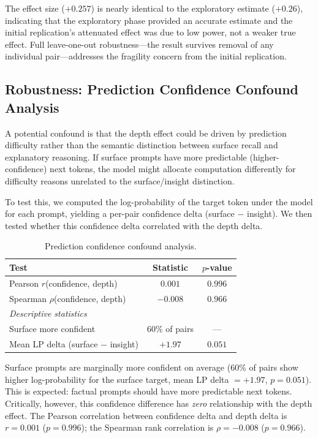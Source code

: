\documentclass[10pt]{article}
\begin{document}
The effect size ($+0.257$) is nearly identical to the exploratory estimate ($+0.26$), indicating that the exploratory phase provided an accurate estimate and the initial replication's attenuated effect was due to low power, not a weaker true effect. Full leave-one-out robustness---the result survives removal of any individual pair---addresses the fragility concern from the initial replication.

\subsection{Robustness: Prediction Confidence Confound Analysis}
\label{sec:confound}

A potential confound is that the depth effect could be driven by prediction difficulty rather than the semantic distinction between surface recall and explanatory reasoning. If surface prompts have more predictable (higher-confidence) next tokens, the model might allocate computation differently for difficulty reasons unrelated to the surface/insight distinction.

To test this, we computed the log-probability of the target token under the model for each prompt, yielding a per-pair confidence delta (surface $-$ insight). We then tested whether this confidence delta correlated with the depth delta.

\begin{table}[h]
\centering
\caption{Prediction confidence confound analysis.}
\label{tab:confound}
\begin{tabular}{lcc}
\toprule
\textbf{Test} & \textbf{Statistic} & \textbf{$p$-value} \\
\midrule
Pearson $r$(confidence, depth) & $0.001$ & $0.996$ \\
Spearman $\rho$(confidence, depth) & $-0.008$ & $0.966$ \\
\midrule
\multicolumn{3}{l}{\textit{Descriptive statistics}} \\
\midrule
Surface more confident & 60\% of pairs & --- \\
Mean LP delta (surface $-$ insight) & $+1.97$ & $0.051$ \\
\bottomrule
\end{tabular}
\end{table}

Surface prompts are marginally more confident on average (60\% of pairs show higher log-probability for the surface target, mean LP delta $= +1.97$, $p = 0.051$). This is expected: factual prompts should have more predictable next tokens. Critically, however, this confidence difference has \textit{zero} relationship with the depth effect. The Pearson correlation between confidence delta and depth delta is $r = 0.001$ ($p = 0.996$); the Spearman rank correlation is $\rho = -0.008$ ($p = 0.966$).
\end{document}
